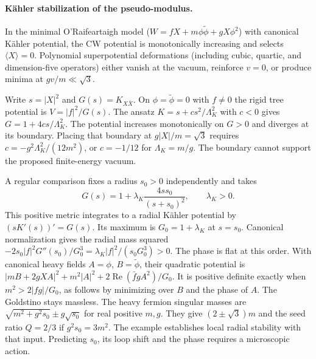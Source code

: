 \documentclass[12pt,a4paper]{article}
\begin{document}
\paragraph{K\"ahler stabilization of the pseudo-modulus.}
In the minimal O'Raifeartaigh model ($W = fX + m\phi\tilde\phi
+ gX\phi^2$) with canonical K\"ahler potential,
the CW potential is monotonically increasing and selects
$\langle X\rangle = 0$.  Polynomial superpotential deformations
(including cubic, quartic, and dimension-five operators)
either vanish at the vacuum, reinforce $v = 0$, or produce
minima at $gv/m \ll \sqrt{3}$.

Write $s=|X|^2$ and $G(s)=K_{X\bar X}$. On $\phi=\tilde\phi=0$
with $f\ne0$ the rigid tree potential is $V=|f|^2/G(s)$. The ansatz
$K=s+cs^2/\Lambda_K^2$ with $c<0$ gives $G=1+4cs/\Lambda_K^2$.
The potential increases monotonically on $G>0$ and diverges at its boundary.
Placing that boundary at $g|X|/m=\sqrt3$ requires
$c=-g^2\Lambda_K^2/(12m^2)$, or $c=-1/12$ for $\Lambda_K=m/g$.
The boundary cannot support the proposed finite-energy vacuum.

A regular comparison fixes a radius $s_0>0$ independently and takes
\begin{equation}
 G(s)=1+\lambda_K\frac{4ss_0}{(s+s_0)^2},\qquad \lambda_K>0 .
 \label{eq:regular-seed-metric}
\end{equation}
This positive metric integrates to a radial K\"ahler potential by
$(sK'(s))'=G(s)$. Its maximum is $G_0=1+\lambda_K$ at $s=s_0$.
Canonical normalization gives the radial mass squared
$-2s_0|f|^2G''(s_0)/G_0^3=\lambda_K|f|^2/(s_0G_0^3)>0$.
The phase is flat at this order. With canonical heavy fields
$A=\phi$, $B=\tilde\phi$, their quadratic potential is
$|mB+2gXA|^2+m^2|A|^2+2\operatorname{Re}(\bar f g A^2)/G_0$.
It is positive definite exactly when $m^2>2|fg|/G_0$, as follows by
minimizing over $B$ and the phase of $A$. The Goldstino stays massless.
The heavy fermion singular masses are $\sqrt{m^2+g^2s_0}\pm g\sqrt{s_0}$
for real positive $m,g$. They give $(2\pm\sqrt3)m$ and the seed ratio
$Q=2/3$ if $g^2s_0=3m^2$. The example establishes local radial stability
with that input. Predicting $s_0$, its loop shift and the phase requires
a microscopic action.
\end{document}
